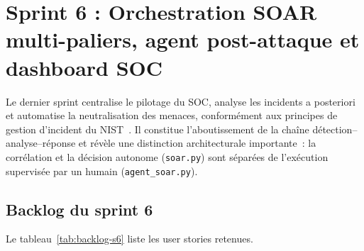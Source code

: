 \section{Sprint 6 : Orchestration SOAR multi-paliers, agent post-attaque et dashboard SOC}\label{sec:sprint6}
Le dernier sprint centralise le pilotage du \ac{SOC}, analyse les incidents a posteriori et automatise la neutralisation des menaces, conformément aux principes de gestion d'incident du \ac{NIST}~\cite{nist80061}. Il constitue l'aboutissement de la chaîne détection--analyse--réponse et révèle une distinction architecturale importante~: la corrélation et la décision autonome (\texttt{soar.py}) sont séparées de l'exécution supervisée par un humain (\texttt{agent\_soar.py}).

\subsection{Backlog du sprint 6}
Le tableau~\ref{tab:backlog-s6} liste les user stories retenues.


